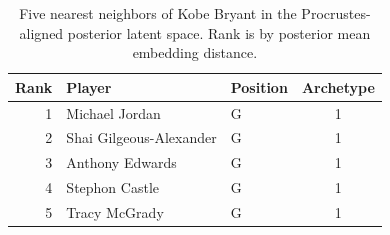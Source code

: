 \begin{table}[htbp]
  \centering\small
  \begin{tabular}{rllc}
    \toprule
    Rank & Player & Position & Archetype \\
    \midrule
    1 & Michael Jordan & G & 1 \\
    2 & Shai Gilgeous-Alexander & G & 1 \\
    3 & Anthony Edwards & G & 1 \\
    4 & Stephon Castle & G & 1 \\
    5 & Tracy McGrady & G & 1 \\
    \bottomrule
  \end{tabular}
  \caption{Five nearest neighbors of Kobe Bryant in the Procrustes-aligned posterior latent space. Rank is by posterior mean embedding distance.}
  \label{tab:Kobe_Bryant_neighbors}
\end{table}

